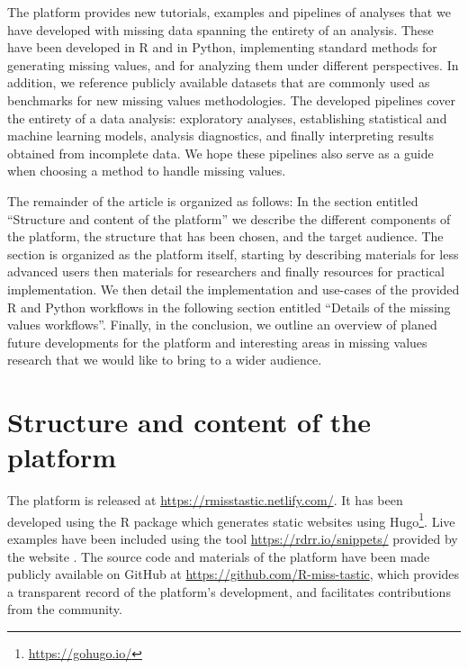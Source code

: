 The platform provides
new tutorials, examples and pipelines of analyses that we have developed with missing data spanning the entirety of an analysis. These have been developed in {R} and in {Python}, implementing standard methods for generating missing values, and for analyzing them under different perspectives. In addition, we reference publicly available datasets that are commonly used as benchmarks for new missing values methodologies. The developed pipelines cover the entirety of a data analysis: exploratory analyses, establishing statistical and machine learning models, analysis diagnostics, and finally  interpreting results obtained from incomplete data. We hope these pipelines also serve as a guide when choosing a method to handle missing values. 





The remainder of the article is organized as follows:
In the section entitled ``Structure and content of the platform'' we
describe the different components of the platform, the structure that has been chosen, and the target audience. The section is organized as the platform
itself, starting by describing materials for less advanced users then materials
for researchers and finally resources for practical implementation. We then detail the implementation and use-cases of the provided {R} and  {Python} workflows in the following section entitled ``Details of the missing values workflows''. Finally, in the conclusion, we outline an overview of planed future developments
for the platform and interesting areas in missing values research that we would like to bring to a wider audience.


\section{Structure and content of the platform}
\label{sec:struct}

The  platform is released at
\url{https://rmisstastic.netlify.com/}. It has been developed using the {R}
package  \citep{xie_etal_bCWRM2017} which generates static websites using Hugo\footnote{\url{https://gohugo.io/}}. Live examples have been included using
the tool \url{https://rdrr.io/snippets/} provided by the website . The source code and materials of the platform have been made publicly available on
GitHub at \url{https://github.com/R-miss-tastic}, which provides a transparent record of the platform's development, and facilitates contributions from the community.


